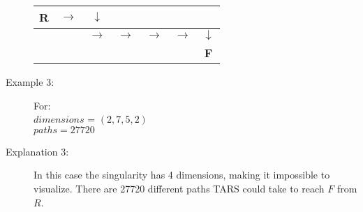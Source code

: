 \begin{description}
    \begin{table}[htbp]
        \centering
        \begin{tabular}{|c|c|c|c|c|c|c|}
            \hline
            \textbf{R} & $\rightarrow$ & $\downarrow$ &  &  &  &  \\
            \hline
             &  & $\rightarrow$ & $\rightarrow$ & $\rightarrow$ & $\rightarrow$ & $\downarrow$ \\
            \hline
             &  &  &  &  &  & \textbf{F} \\
            \hline
        \end{tabular}
    \end{table}

    \item[Example 3:] For:\\
    $dimensions$ = $(2,7,5,2)$\\
    $paths = 27720$

    \item[Explanation 3:]
    In this case the singularity has 4 dimensions, making it impossible to visualize. There are 27720 different paths TARS could take to reach $F$ from $R$.
\end{description}

